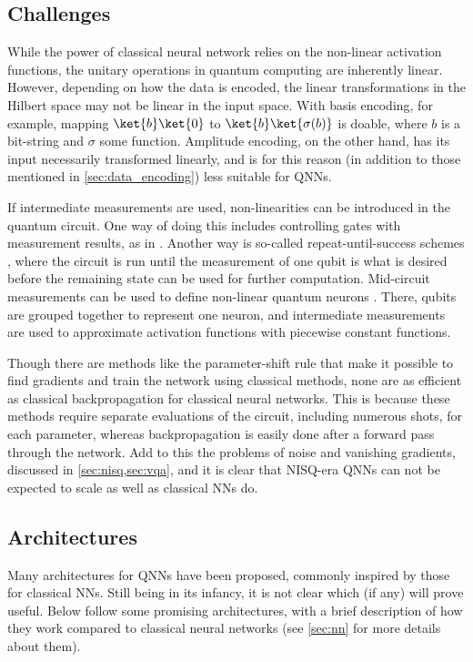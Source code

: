 \subsection{Challenges}
While the power of classical neural network relies on the non-linear activation functions, the unitary operations in quantum computing are inherently linear.
However, depending on how the data is encoded, the linear transformations in the Hilbert space may not be linear in the input space.
With basis encoding, for example, mapping $\ket{b}\ket{0}$ to $\ket{b}\ket{\sigma(b)}$ is doable, where $b$ is a bit-string and $\sigma$ some function.
Amplitude encoding, on the other hand, has its input necessarily transformed linearly, and is for this reason (in addition to those mentioned in \cref{sec:data_encoding}) less suitable for QNNs.

If intermediate measurements are used, non-linearities can be introduced in the quantum circuit.
One way of doing this includes controlling gates with measurement results, as in \cite{cong2019}.
Another way is so-called repeat-until-success schemes \cite{cao2017}, where the circuit is run until the measurement of one qubit is what is desired before the remaining state can be used for further computation.
Mid-circuit measurements can be used to define non-linear quantum neurons \cite{yan2020}.
There, qubits are grouped together to represent one neuron, and intermediate measurements are used to approximate activation functions with piecewise constant functions.

Though there are methods like the parameter-shift rule that make it possible to find gradients and train the network using classical methods, none are as efficient as classical backpropagation for classical neural networks.
This is because these methods require separate evaluations of the circuit, including numerous shots, for each parameter, whereas backpropagation is easily done after a forward pass through the network.
Add to this the problems of noise and vanishing gradients, discussed in \cref{sec:nisq,sec:vqa}, and it is clear that NISQ-era QNNs can not be expected to scale as well as classical NNs do.


\subsection{Architectures}
Many architectures for QNNs have been proposed, commonly inspired by those for classical NNs.
Still being in its infancy, it is not clear which (if any) will prove useful.
Below follow some promising architectures, with a brief description of how they work compared to classical neural networks (see \cref{sec:nn} for more details about them).

